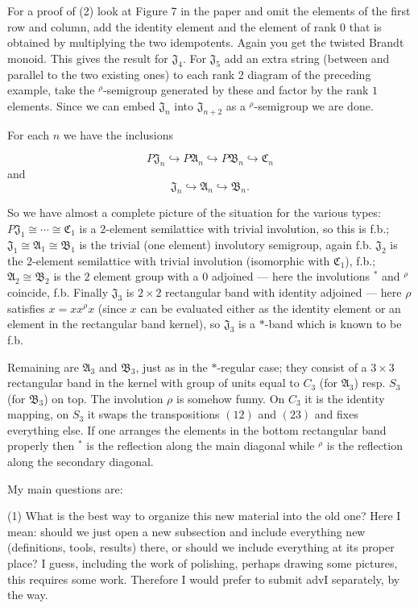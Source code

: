\documentclass[11pt,reqno]{amsart}
\numberwithin{equation}{section}
\theoremstyle{remark}
\def\A{\mathfrak{A}}
\def\C{\mathfrak{C}}
\def\B{\mathfrak{B}}
\def\J{\mathfrak{J}}
\begin{document}
For a proof of (2) look at Figure 7 in the paper and omit the elements of the first row and column, add the identity element and the element of rank $0$ that is obtained by multiplying the two idempotents. Again you get the twisted Brandt monoid. This gives the result for $\J_4$. For $\J_5$ add an extra string (between and parallel to the two existing ones) to each rank 2 diagram of the preceding example, take the ${}^\rho$-semigroup generated by these and factor by the rank $1$ elements. Since we can embed $\J_n$ into $\J_{n+2}$ as a ${}^\rho$-semigroup we are done.

For each $n$ we have the inclusions

$$P\J_n\hookrightarrow P\A_n\hookrightarrow P\B_n\hookrightarrow \C_n$$
and 
$$ \J_n\hookrightarrow\A_n\hookrightarrow\B_n.$$

So we have almost a complete picture of the situation for the various types: $P\J_1\cong \cdots\cong \C_1$ is a $2$-element semilattice with trivial involution, so this is f.b.; $\J_1\cong\A_1\cong\B_1$ is the trivial (one element) involutory semigroup, again f.b. $\J_2$ is the $2$-element semilattice with trivial involution (isomorphic with $\C_1$), f.b.; $\A_2\cong \B_2$ is the $2$ element group with a $0$ adjoined --- here the involutions ${}^*$ and ${}^\rho$ coincide, f.b. Finally $\J_3$ is $2\times 2$ rectangular band with identity adjoined --- here $\rho$ satisfies $x=xx^\rho x$ (since $x$ can be evaluated either as the identity element or an element in the rectangular band kernel), so $\J_3$ is a  $*$-band which is known to be f.b.

Remaining are $\A_3$ and $\B_3$, just as in the $*$-regular case; they consist of a $3\times 3$ rectangular band in the kernel with group of units equal to $C_3$ (for $\A_3$) resp. $S_3$ (for $\B_3$) on top. The involution $\rho$ is somehow funny. On $C_3$ it is the identity mapping, on $S_3$ it swaps the transpositions $(12)$ and $(23)$ and fixes everything else. If one arranges the elements in the bottom rectangular band properly then ${}^*$ is the reflection along the main diagonal while ${}^\rho$ is the reflection along the secondary diagonal.

My main questions are:

(1) What is the best way to organize this new material into the old one? Here I mean: should we just open a new subsection and include everything new (definitions, tools, results) there, or should we include everything at its proper place?  I guess, including the work of polishing, perhaps drawing some pictures, this requires some work. Therefore I would prefer to submit advI separately, by the way.
 
\end{document}
